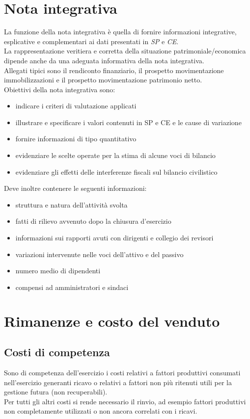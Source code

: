 \documentclass{report}
\begin{document}
	\section{Nota integrativa}
	La funzione della nota integrativa è quella di fornire informazioni integrative, esplicative e complementari ai dati presentati in \textit{SP} e \textit{CE}.\medskip \\La rappresentazione veritiera e corretta della situazione patrimoniale/economica dipende anche da una adeguata informativa della nota integrativa.\medskip \\Allegati tipici sono il rendiconto finanziario, il prospetto movimentazione immobilizzazioni e il prospetto movimentazione patrimonio netto.\medskip \\Obiettivi della nota integrativa sono:
	\begin{itemize}
		\item indicare i criteri di valutazione applicati
		\item illustrare e specificare i valori contenuti in SP e CE e le cause di variazione
		\item fornire informazioni di tipo quantitativo
		\item evidenziare le scelte operate per la stima di alcune voci di bilancio
		\item evidenziare gli effetti delle interferenze fiscali sul bilancio civilistico
	\end{itemize}
	Deve inoltre contenere le seguenti informazioni:
	\begin{itemize}
		\item struttura e natura dell'attività svolta
		\item fatti di rilievo avvenuto dopo la chiusura d'esercizio
		\item informazioni sui rapporti avuti con dirigenti e collegio dei revisori
		\item variazioni intervenute nelle voci dell'attivo e del passivo
		\item numero medio di dipendenti
		\item compensi ad amministratori e sindaci
	\end{itemize}
	\section{Rimanenze e costo del venduto}
	\subsection{Costi di competenza}
	Sono di competenza dell'esercizio i costi relativi a fattori produttivi consumati nell'esercizio generanti ricavo o relativi a fattori non più ritenuti utili per la gestione futura (non recuperabili).
	\medskip \\Per tutti gli altri costi si rende necessario il rinvio, ad esempio fattori produttivi non completamente utilizzati o non ancora correlati con i ricavi.
\end{document}
